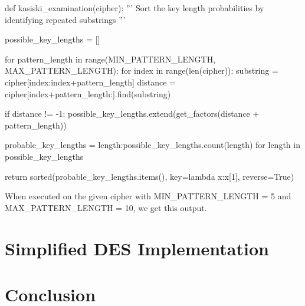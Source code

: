 \documentclass{article}
\begin{document}
    \begin{python}

def kasiski_examination(cipher):
''' Sort the key length probabilities by identifying repeated substrings '''

    possible_key_lengths = []

    for pattern_length in range(MIN_PATTERN_LENGTH, MAX_PATTERN_LENGTH):
        for index in range(len(cipher)):
            substring = cipher[index:index+pattern_length]
            distance = cipher[index+pattern_length:].find(substring)

            if distance != -1:
                possible_key_lengths.extend(get_factors(distance + pattern_length))

    probable_key_lengths = {length:possible_key_lengths.count(length) for length in possible_key_lengths}

    return sorted(probable_key_lengths.items(), key=lambda x:x[1], reverse=True)

    \end{python}

When executed on the given cipher with MIN\_PATTERN\_LENGTH = 5 and MAX\_PATTERN\_LENGTH = 10, we get this output.

\section{Simplified DES Implementation}

\section{Conclusion}




\end{document}
